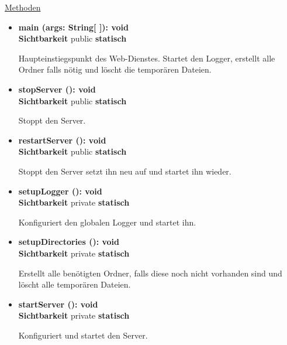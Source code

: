 \underline{Methoden}
\begin{itemize}
\itemsep0pt
\item \textbf{main (args: String[ ]): void}\hfill\\
\textbf{Sichtbarkeit} public \newline
\textbf{statisch}

Haupteinstiegspunkt des Web-Dienstes. Startet den Logger, erstellt alle Ordner falls nötig und löscht die temporären Dateien.

\item \textbf{stopServer (): void}\hfill\\
\textbf{Sichtbarkeit} public \newline
\textbf{statisch}

Stoppt den Server.

\item \textbf{restartServer (): void}\hfill\\
\textbf{Sichtbarkeit} public \newline
\textbf{statisch}

Stoppt den Server setzt ihn neu auf und startet ihn wieder.

\item \textbf{setupLogger (): void}\hfill\\
\textbf{Sichtbarkeit} private \newline
\textbf{statisch}

Konfiguriert den globalen Logger und startet ihn.

\item \textbf{setupDirectories (): void}\hfill\\
\textbf{Sichtbarkeit} private \newline
\textbf{statisch}

Erstellt alle benötigten Ordner, falls diese noch nicht vorhanden sind und löscht alle temporären Dateien.

\item \textbf{startServer (): void}\hfill\\
\textbf{Sichtbarkeit} private \newline
\textbf{statisch}

Konfiguriert und startet den Server.
\end{itemize}